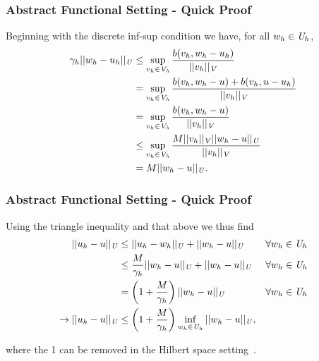 \begin{frame}
\frametitle{Abstract Functional Setting - Quick Proof}

Beginning with the discrete inf-sup condition we have, for all $w_h \in \mathit{{{U}}}_h$,
\begin{align}
  \gamma_h ||w_h-u_h||_{\mathit{{{U}}}}
  & \le \sup_{v_h\in\mathit{{{V_h}}}} \frac{b(v_h,w_h-u_h)}{||v_h||_{\mathit{{{V}}}}} \\
  & = \sup_{v_h\in\mathit{{{V_h}}}} \frac{b(v_h,w_h-u)+b(v_h,u-u_h)}{||v_h||_{\mathit{{{V}}}}} \\
  & = \sup_{v_h\in\mathit{{{V_h}}}} \frac{b(v_h,w_h-u)}{||v_h||_{\mathit{{{V}}}}} \\
  & \le \sup_{v_h\in\mathit{{{V_h}}}} \frac{M ||v_h||_{\mathit{{{V}}}}||w_h-u||_{\mathit{{{U}}}}}{||v_h||_{\mathit{{{V}}}}} \\
  & = M ||w_h-u||_{\mathit{{{U}}}}.
\end{align}

\end{frame}

\begin{frame}
\frametitle{Abstract Functional Setting - Quick Proof}

Using the triangle inequality and that above we thus find
\begin{align}
  ||u_h-u||_\fspace{U}
  & \le || u_h-w_h ||_\fspace{U} + || w_h-u ||_\fspace{U}\ && \forall w_h \in \fspace{U}_h \\
  & \le \frac{M}{\gamma_h} || w_h-u ||_\fspace{U} + || w_h-u ||_\fspace{U}\ && \forall w_h \in \fspace{U}_h \\
  & = \left(1 + \frac{M}{\gamma_h}\right) || w_h-u ||_\fspace{U}\ && \forall w_h \in \fspace{U}_h \\
  \rightarrow
  ||u_h-u||_\fspace{U} & \le \left(1 + \frac{M}{\gamma_h}\right) \inf_{w_h \in \fspace{U}_h}|| w_h-u ||_\fspace{U},
\end{align}

where the 1 can be removed in the Hilbert space setting~\cite{Xu2003}.

\end{frame}

